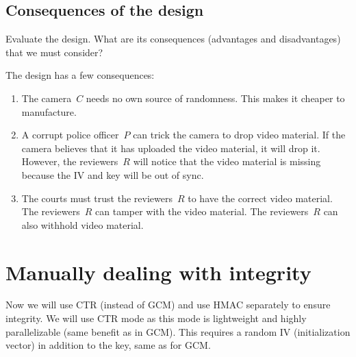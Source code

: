 \subsection{Consequences of the design}\label{ConsequencesFirst}

\begin{exercise}
  Evaluate the design.
  What are its consequences (advantages and disadvantages) that we must 
  consider?
\end{exercise}

The design has a few consequences:
\begin{enumerate}
  \item The camera~\(C\) needs no own source of randomness.
    This makes it cheaper to manufacture.
  \item A corrupt police officer~\(P\) can trick the camera to drop video 
    material.
    If the camera believes that it has uploaded the video material, it will 
    drop it.
    However, the reviewers~\(R\) will notice that the video material is missing 
    because the IV and key will be out of sync.
  \item The courts must trust the reviewers~\(R\) to have the correct video 
    material.
    The reviewers~\(R\) can tamper with the video material.
    The reviewers~\(R\) can also withhold video material.
\end{enumerate}


\section{Manually dealing with integrity}\label{HMAC}


Now we will use \ac{CTR} (instead of \ac{GCM}) and use HMAC separately
to ensure integrity.
We will use \ac{CTR} mode as this mode is lightweight and highly
parallelizable (same benefit as in \ac{GCM}).
This requires a random IV (initialization vector) in addition to the key, same
as for \ac{GCM}\@.

